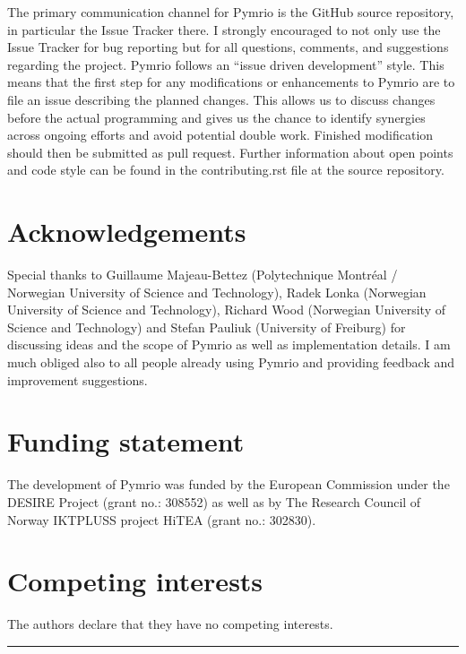 \documentclass{jors}
\begin{document}
The primary communication channel for Pymrio is the GitHub source repository, in particular the Issue Tracker there. 
I strongly encouraged to not only use the Issue Tracker for bug reporting but for all questions, comments, and suggestions regarding the project.
Pymrio follows an ``issue driven development'' style. This means that the first step for any modifications or enhancements to Pymrio are to file an issue describing the planned changes.
This allows us to discuss changes before the actual programming and gives us the chance to identify synergies across ongoing efforts and avoid potential double work. 
Finished modification should then be submitted as pull request. Further information about open points and code style can be found in the contributing.rst file at the source repository.

\section*{Acknowledgements}
Special thanks to 
Guillaume Majeau-Bettez (Polytechnique Montréal / Norwegian University of Science and Technology), 
Radek Lonka (Norwegian University of Science and Technology),
Richard Wood (Norwegian University of Science and Technology) and
Stefan Pauliuk (University of Freiburg) 
for discussing ideas and the scope of Pymrio as well as implementation details.
I am much obliged also to all people already using Pymrio and providing feedback and improvement suggestions. 


\section*{Funding statement}

The development of Pymrio was funded by the European Commission under the DESIRE Project (grant no.: 308552) as well as by The Research Council of Norway IKTPLUSS project HiTEA (grant no.: 302830).

\section*{Competing interests}

The authors declare that they have no competing interests.



\printbibliography  

\vspace{2cm}

\rule{\textwidth}{1pt}
\end{document}
